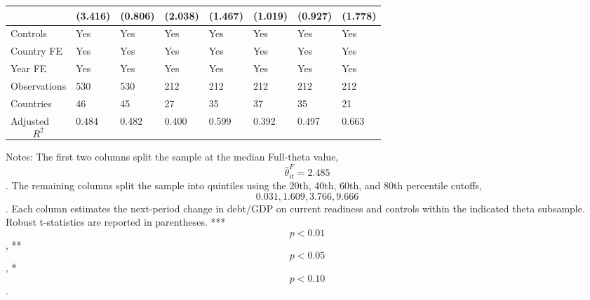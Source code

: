 \begin{table}[H]
\begin{threeparttable}
\begin{tabularx}{\textwidth}{lYYYYYYY}
  & (3.416) & (0.806) & (2.038) & (1.467) & (1.019) & (0.927) & (1.778) \\
\midrule
Controls & Yes & Yes & Yes & Yes & Yes & Yes & Yes \\
Country FE & Yes & Yes & Yes & Yes & Yes & Yes & Yes \\
Year FE & Yes & Yes & Yes & Yes & Yes & Yes & Yes \\
Observations & 530 & 530 & 212 & 212 & 212 & 212 & 212 \\
Countries & 46 & 45 & 27 & 35 & 37 & 35 & 21 \\
Adjusted $$R^2$$ & 0.484 & 0.482 & 0.400 & 0.599 & 0.392 & 0.497 & 0.663 \\
\bottomrule
\end{tabularx}
\begin{tablenotes}[flushleft]\footnotesize
\item Notes: The first two columns split the sample at the median Full-theta value, $$\widehat{\theta}^{F}_{it}=2.485$$. The remaining columns split the sample into quintiles using the 20th, 40th, 60th, and 80th percentile cutoffs, $$0.031, 1.609, 3.766, 9.666$$. Each column estimates the next-period change in debt/GDP on current readiness and controls within the indicated theta subsample. Robust t-statistics are reported in parentheses. *** $$p<0.01$$, ** $$p<0.05$$, * $$p<0.10$$.
\end{tablenotes}
\end{threeparttable}
\end{table}
